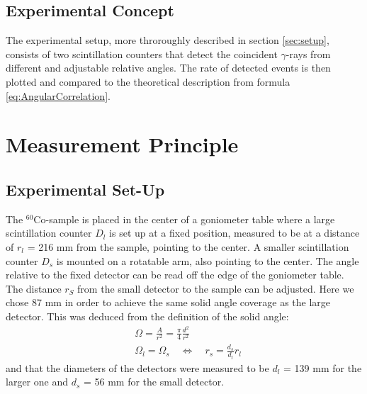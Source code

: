 \documentclass[a4paper,parskip,11pt, DIV12]{scrreprt}
\begin{document}
\section{Experimental Concept}

		The experimental setup, more throroughly described in section \ref{sec:setup}, consists of two scintillation counters that detect the coincident $\gamma$-rays from different and adjustable relative angles. The rate of detected events is then plotted and compared to the theoretical description from formula \ref{eq:AngularCorrelation}.
		
\chapter{Measurement Principle}	

\section{Experimental Set-Up}

		The $^{60}$Co-sample is placed in the center of a goniometer table where a large scintillation counter $D_l$ is set up at a fixed position, measured to be at a distance of $r_l$ = 216 mm from the sample, pointing to the center. A smaller scintillation counter $D_s$ is mounted on a rotatable arm, also pointing to the center. The angle relative to the fixed detector can be read off the edge of the goniometer table. The distance $r_S$ from the small detector to the sample can be adjusted. Here we chose 87 mm in order to achieve the same solid angle coverage as the large detector. This was deduced from the definition of the solid angle:\begin{eqnarray}
&\Omega  = \frac{A}{r^2} = \frac{\pi}{4} \frac{d^2}{r^2} \\
&\Omega_l = \Omega_s \quad \iff \quad r_s = \frac{d_s}{d_l} r_l
\end{eqnarray} and that the diameters of the detectors were measured to be $d_l$ = 139 mm for the larger one and $d_s$ = 56 mm for the small detector. 
\end{document}
